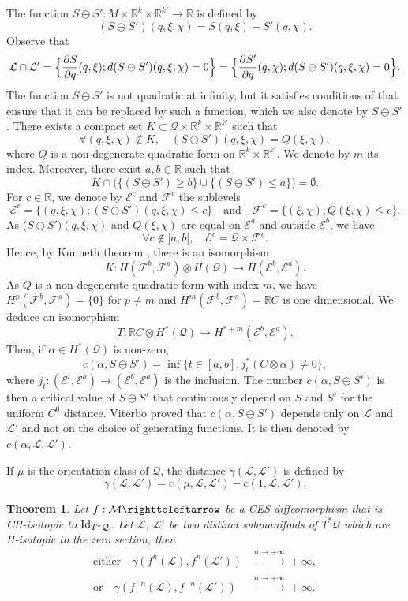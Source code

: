 \documentclass[JEP,XML,SOM,Unicode,published]{cedram}
\newtheorem{theorem}{Theorem}
\theoremstyle{definition}
\def\R{\mathbb{R}}
\def\cE{{\mathcal E}}
\def\cF{{\mathcal F}}
\def\cL{{\mathcal L}}
\def\cM{{\mathcal M}}
\def\cQ{{\mathcal Q}}
\begin{document}
The function $S\ominus S':M\times \R^k\times \R^{k'}\to \R$ is defined by
\[
(S\ominus S')(q, \xi, \chi)=S(q, \xi)-S'(q, \chi).
\]
Observe that
\[
\cL\cap\cL'=\Bigl\{\frac{\partial S}{\partial q}(q,\xi); d(S\ominus S')(q, \xi, \chi)=0\Bigr\}=\Bigl\{\frac{\partial S'}{\partial q}(q, \chi); d(S\ominus S')(q, \xi, \chi)=0\Bigr\}.
\]
The function $S\ominus S'$ is not quadratic at infinity, but it satisfies conditions of \cite[Prop.\,1.6.]{Vit2004} that ensure that it can be replaced by such a function, which we also denote by $S\ominus S'$.
There exists a compact set $K\subset \cQ\times \R^k\times \R^{k'}$ such that
\[
\forall (q, \xi, \chi)\notin K,\quad (S\ominus S')(q, \xi, \chi)=Q(\xi, \chi),
\]
where $Q$ is a non degenerate quadratic form on $\R^k\times \R^{k'}$. We denote by $m$ its index. Moreover, there exist $a, b\in\R$ such that
\[
K\cap \Big(\{ (S\ominus S')\geq b\}\cup \{ (S\ominus S')\leq a\}\Big)=\emptyset.
\]
For $c\in\R$, we denote by $\cE^c$ and $\cF^c$ the sublevels
\[
\cE^c=\{ (q, \xi, \chi); (S\ominus S')(q, \xi, \chi)\leq c\}\quad\text{and}\quad \cF^c=\{ (\xi, \chi); Q(\xi, \chi)\leq c\}.
\]
As ($S\ominus S')(q, \xi, \chi)$ and $Q(\xi, \chi)$ are equal on $\cE^a$ and outside $\cE^b$, we have
\[
\forall c\notin{}]a, b[,\quad \cE^c=\cQ\times \cF^c.
\]
Hence, by Kunneth theorem \cite{God1971},
there is an isomorphism
\[
K:H(\cF^b, \cF^a)\otimes H(\cQ)\to H(\cE^b, \cE^a).
\]
As $Q$ is a non-degenerate quadratic form with index $m$, we have $H^p(\cF^b, \cF^a)=\{ 0\}$ for $p\not=m$ and $H^m(\cF^b, \cF^a)=\R C$ is one dimensional. We deduce an isomorphism
\[
T:\R C\otimes H^*(\cQ)\to H^{*+m}(\cE^b, \cE^a).
\]
Then, if $\alpha\in H^*(\cQ)$ is non-zero,
\[
c(\alpha, S\ominus S')=\inf\{ t\in [a, b], j_t^*(C\otimes\alpha)\not=0\},
\]
where $j_t:(\cE^t, \cE^a)\to (\cE^b, \cE^a)$ is the inclusion. The number $c(\alpha, S\ominus S')$ is then a critical value of $S\ominus S'$ that continuously depend on $S$ and $S'$ for the uniform $C^0$ distance.
Viterbo proved that $c(\alpha, S\ominus S')$ depends only on $\cL$ and $\cL'$ and not on the choice of generating functions. It is then denoted by $c(\alpha, \cL, \cL')$.

If $\mu$ is the orientation class of $\cQ$, the distance $\gamma(\cL,\cL')$ is defined by
\[
\gamma(\cL, \cL')=c(\mu, \cL, \cL')-c(1, \cL, \cL').
\]

\begin{theorem}\label{Tconformgamma}
Let $f: \cM \righttoleftarrow$ be a CES diffeomorphism that is CH-isotopic to ${\rm Id}_{T^*\cQ}$. Let $\cL$, $\cL'$ be two distinct submanifolds of $T^*\cQ$ which are H-isotopic to the zero section, then
\begin{align*}
\text{either}\quad\gamma (f^n(\cL), f^n(\cL'))&\xrightarrow[]{n\to +\infty}+\infty,\\
\text{or}\quad\gamma (f^{-n}(\cL), f^{-n}(\cL'))&\xrightarrow[]{n\to +\infty}+\infty.
\end{align*}
\end{theorem}
\end{document}
